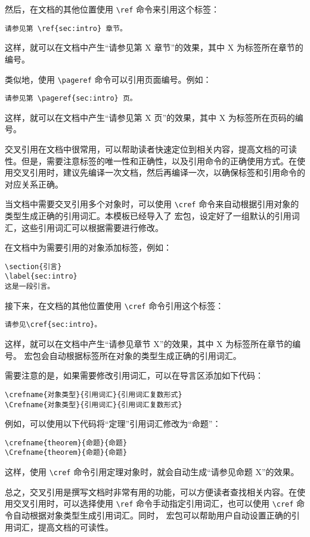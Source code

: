然后，在文档的其他位置使用 \verb|\ref| 命令来引用这个标签：

\begin{verbatim}
请参见第 \ref{sec:intro} 章节。
\end{verbatim}

这样，就可以在文档中产生“请参见第 X 章节”的效果，其中 X 为标签所在章节的编号。

类似地，使用 \verb|\pageref| 命令可以引用页面编号。例如：

\begin{verbatim}
请参见第 \pageref{sec:intro} 页。
\end{verbatim}

这样，就可以在文档中产生“请参见第 X 页”的效果，其中 X 为标签所在页码的编号。

交叉引用在文档中很常用，可以帮助读者快速定位到相关内容，提高文档的可读性。但是，需要注意标签的唯一性和正确性，以及引用命令的正确使用方式。在使用交叉引用时，建议先编译一次文档，然后再编译一次，以确保标签和引用命令的对应关系正确。

当文档中需要交叉引用多个对象时，可以使用 \verb|\cref| 命令来自动根据引用对象的类型生成正确的引用词汇。本模板已经导入了  宏包，设定好了一组默认的引用词汇，这些引用词汇可以根据需要进行修改。

在文档中为需要引用的对象添加标签，例如：

\begin{verbatim}
\section{引言}
\label{sec:intro}
这是一段引言。
\end{verbatim}

接下来，在文档的其他位置使用 \verb|\cref| 命令引用这个标签：
\begin{verbatim}
请参见\cref{sec:intro}。
\end{verbatim}
这样，就可以在文档中产生“请参见章节 X”的效果，其中 X 为标签所在章节的编号。 宏包会自动根据标签所在对象的类型生成正确的引用词汇。

需要注意的是，如果需要修改引用词汇，可以在导言区添加如下代码：

\begin{verbatim}
\crefname{对象类型}{引用词汇}{引用词汇复数形式}
\Crefname{对象类型}{引用词汇}{引用词汇复数形式}
\end{verbatim}

例如，可以使用以下代码将“定理”引用词汇修改为“命题”：
\begin{verbatim}
\crefname{theorem}{命题}{命题}
\Crefname{theorem}{命题}{命题}
\end{verbatim}
这样，使用 \verb|\cref| 命令引用定理对象时，就会自动生成“请参见命题 X”的效果。

总之，交叉引用是撰写文档时非常有用的功能，可以方便读者查找相关内容。在使用交叉引用时，可以选择使用 \verb|\ref| 命令手动指定引用词汇，也可以使用 \verb|\cref| 命令自动根据对象类型生成引用词汇。同时， 宏包可以帮助用户自动设置正确的引用词汇，提高文档的可读性。
